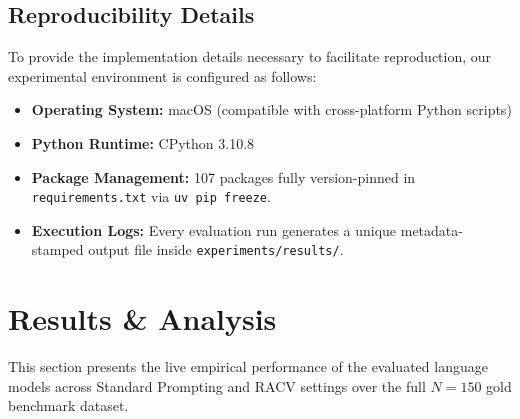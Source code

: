 \documentclass[conference]{IEEEtran}
\begin{document}
\subsection{Reproducibility Details}
To provide the implementation details necessary to facilitate reproduction, our experimental environment is configured as follows:
\begin{itemize}
\item \textbf{Operating System:} macOS (compatible with cross-platform Python scripts)
\item \textbf{Python Runtime:} CPython 3.10.8
\item \textbf{Package Management:} 107 packages fully version-pinned in \texttt{requirements.txt} via \texttt{uv pip freeze}.
\item \textbf{Execution Logs:} Every evaluation run generates a unique metadata-stamped output file inside \texttt{experiments/results/}.
\end{itemize}

\section{Results \& Analysis}
\label{sec:results}
This section presents the live empirical performance of the evaluated language models across Standard Prompting and RACV settings over the full $N=150$ gold benchmark dataset.
\end{document}
